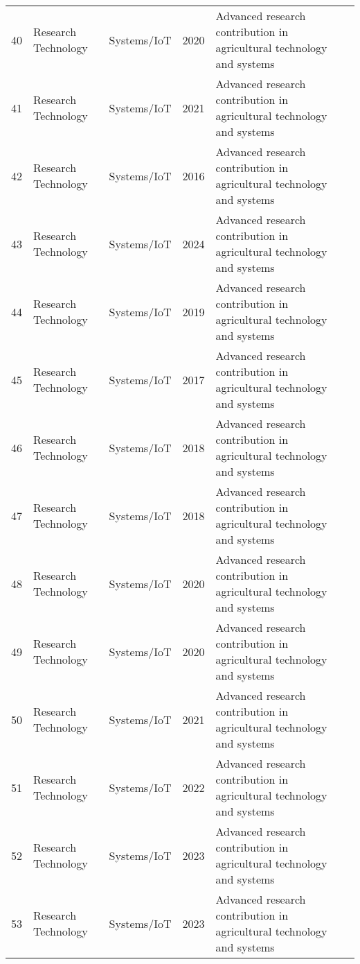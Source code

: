 \begin{table*}[htbp]
\begin{tabular}{p{}p{}p{}p{}p{}p{}}
 40 & Research Technology & Systems/IoT & 2020 & Advanced research contribution in agricultural technology and systems & \cite{xiong2020autonomous} \\
 41 & Research Technology & Systems/IoT & 2021 & Advanced research contribution in agricultural technology and systems & \cite{xiong2021improved} \\
 42 & Research Technology & Systems/IoT & 2016 & Advanced research contribution in agricultural technology and systems & \cite{yaguchi2016development} \\
 43 & Research Technology & Systems/IoT & 2024 & Advanced research contribution in agricultural technology and systems & \cite{yaseen2024yolov9} \\
 44 & Research Technology & Systems/IoT & 2019 & Advanced research contribution in agricultural technology and systems & \cite{yu2019fruit} \\
 45 & Research Technology & Systems/IoT & 2017 & Advanced research contribution in agricultural technology and systems & \cite{zhang2017reconfigurable} \\
 46 & Research Technology & Systems/IoT & 2018 & Advanced research contribution in agricultural technology and systems & \cite{zhang2018deep} \\
 47 & Research Technology & Systems/IoT & 2018 & Advanced research contribution in agricultural technology and systems & \cite{zhang2018reconfigurable} \\
 48 & Research Technology & Systems/IoT & 2020 & Advanced research contribution in agricultural technology and systems & \cite{zhang2020reconfigurable} \\
 49 & Research Technology & Systems/IoT & 2020 & Advanced research contribution in agricultural technology and systems & \cite{zhang2020technology} \\
 50 & Research Technology & Systems/IoT & 2021 & Advanced research contribution in agricultural technology and systems & \cite{zhang2021reconfigurable} \\
 51 & Research Technology & Systems/IoT & 2022 & Advanced research contribution in agricultural technology and systems & \cite{zhang2022reconfigurable} \\
 52 & Research Technology & Systems/IoT & 2023 & Advanced research contribution in agricultural technology and systems & \cite{zhang2023deep} \\
 53 & Research Technology & Systems/IoT & 2023 & Advanced research contribution in agricultural technology and systems & \cite{zhang2023reconfigurable} \\

\end{tabular}
\end{table*}
